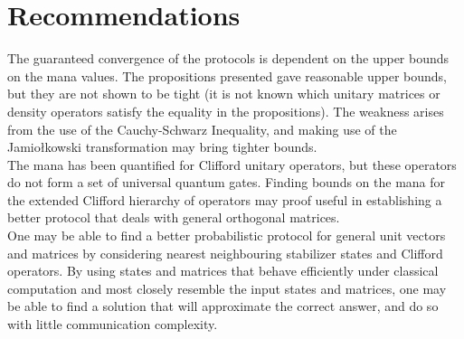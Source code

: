 \documentclass[../3Wworkreport.tex]{subfiles}
\begin{document}
\chapter{Recommendations}
\label{chap:recommendations}

The guaranteed convergence of the protocols is dependent on the upper bounds on the mana values. The propositions presented gave reasonable upper bounds, but they are not shown to be tight (it is not known which unitary matrices or density operators satisfy the equality in the propositions). The weakness arises from the use of the Cauchy-Schwarz Inequality, and making use of the Jamio\l kowski transformation may bring tighter bounds.\\

The mana has been quantified for Clifford unitary operators, but these operators do not form a set of universal quantum gates. Finding bounds on the mana for the extended Clifford hierarchy of operators may proof useful in establishing a better protocol that deals with general orthogonal matrices.\\

One may be able to find a better probabilistic protocol for general unit vectors and matrices by considering nearest neighbouring stabilizer states and Clifford operators. By using states and matrices that behave efficiently under classical computation and most closely resemble the input states and matrices, one may be able to find a solution that will approximate the correct answer, and do so with little communication complexity.
\end{document}
